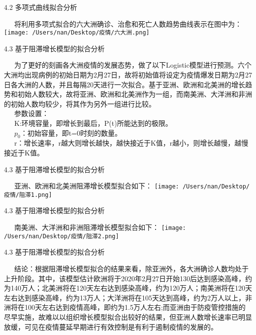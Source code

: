\documentclass[
  ignorenonframetext,
]{beamer}
\begin{document}
\begin{frame}{4.2 多项式曲线拟合分析}
\protect\hypertarget{section-35}{}

  将利用多项式拟合的六大洲确诊、治愈和死亡人数趋势曲线表示在图中为：
\texttt{[image: /Users/nan/Desktop/疫情/六大洲.png]}

\end{frame}

\begin{frame}{4.3 基于阻滞增长模型的拟合分析}
\protect\hypertarget{section-36}{}

  为了更好的刻画各大洲疫情的发展态势，做了以下Logistic模型进行预测。六个大洲均出现病例的初始日期为2月27日，故将初始值将设定为疫情爆发日期为2月27日各大洲的人数，并且每隔20天进行一次拟合。基于亚洲、欧洲和北美洲的增长趋势和初始人数较大，故将亚洲、欧洲和北美洲作为一组，而南美洲、大洋洲和非洲的初始人数均较少，将其作为另外一组进行比较。\\
  参数设置：\\
  K:环境容量，即增长到最后，P(t)所能达到的极限。\\
  \(p_0\)：初始容量，即t=0时刻的数量。\\
  r：增长速率，r越大则增长越快，越快接近于K值，r越小，则增长越慢，越慢接近于K值。

\end{frame}

\begin{frame}{4.3 基于阻滞增长模型的拟合分析}
\protect\hypertarget{section-37}{}

  亚洲、欧洲和北美洲阻滞增长模型拟合如下：
\texttt{[image: /Users/nan/Desktop/疫情/阻滞1.png]}

\end{frame}

\begin{frame}{4.3 基于阻滞增长模型的拟合分析}
\protect\hypertarget{section-38}{}

  南美洲、大洋洲和非洲阻滞增长模型拟合如下：
\texttt{[image: /Users/nan/Desktop/疫情/阻滞2.png]}

\end{frame}

\begin{frame}{4.3 基于阻滞增长模型的拟合分析}
\protect\hypertarget{section-39}{}

  结论：根据阻滞增长模型拟合的结果来看，除亚洲外，各大洲确诊人数均处于上升阶段。其中，该模型估计欧洲将于2020年2月27日开始130后达到感染高峰，约为140万人；北美洲将在120天左右达到感染高峰，约为120万人；南美洲将在120天左右达到感染高峰，约为13万人；大洋洲将在105天达到高峰，约为2万人以上，非洲将在100天左右达到疫情高峰，即约为1.5万人左右;而亚洲由于防疫管控措施的尽早实施，故难以以组织增长模型拟合出较好的结果，但亚洲人数增长速率已明显放缓，可见在疫情蔓延早期进行有效控制是有利于遏制疫情的发展的。

\end{frame}
\end{document}
